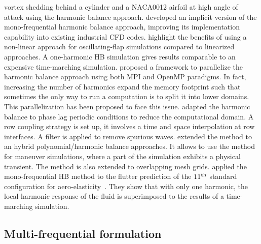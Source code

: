 vortex shedding behind a cylinder and a NACA0012 airfoil 
at high angle of attack using the harmonic balance approach.
\citet{JSicot2008} developed an implicit
version of the mono-frequential harmonic
balance approach, improving its implementation
capability into existing industrial CFD codes.
\citet{JDufour2009} highlight the benefits of using a 
non-linear approach for oscillating-flap simulations
compared to linearized approaches. A one-harmonic HB simulation
gives results comparable to an expensive time-marching simulation.
\citet{Jackson2011} proposed a framework to 
parallelize the harmonic balance approach using
both MPI and OpenMP paradigms. In fact, increasing the
number of harmonics expand the memory footprint such
that sometimes the only way to run a computation is 
to split it into lower domains. This parallelization
has been proposed to face this issue. 
\citet{JSicot2012} adapted the harmonic balance 
to phase lag periodic 
conditions to reduce the computational domain. 
A row coupling strategy is set up, it involves 
a time and space interpolation at row interfaces.
A filter is applied to remove spurious waves.
\citet{Mavriplis2012} extended the method to 
an hybrid polynomial/harmonic balance approaches. 
It allows to use the method for maneuver simulations, 
where a part of the simulation exhibits a physical transient.
The method is also extended to overlapping mesh grids.
\citet{Huang2013} applied the mono-frequential
HB method to the flutter prediction of the 
$11\textsuperscript{th}$ 
standard configuration for aero-elasticity~\cite{Fransson1999}.
They show that with only one harmonic, the local
harmonic response of the fluid is superimposed
to the results of a time-marching simulation.

\subsection{Multi-frequential formulation}

